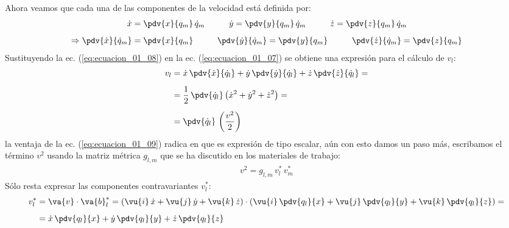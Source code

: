 Ahora veamos que cada una de las componentes de la velocidad está definida por:
\begin{align}
\begin{aligned}[b]
\dot{x} &= \pdv{x}{q_{m}} \, \dot{q}_{m} \hspace{1cm} \dot{y} = \pdv{y}{q_{m}} \, \dot{q}_{m} \hspace{1cm} \dot{z} = \pdv{z}{q_{m}} \, \dot{q}_{m} \\[0.5em]
\Rightarrow \pdv{\dot{x}}{\dot{q}_{m}} &= \pdv{x}{q_{m}}  \hspace{1cm} \pdv{\dot{y}}{\dot{q}_{m}} = \pdv{y}{q_{m}}  \hspace{1cm} \pdv{\dot{z}}{\dot{q}_{m}} = \pdv{z}{q_{m}} 
\end{aligned}
\label{eq:ecuacion_01_08}
\end{align}
Sustituyendo la ec. (\ref{eq:ecuacion_01_08}) en la ec. (\ref{eq:ecuacion_01_07}) se obtiene una expresión para el cálculo de $v_{l}$:
\begin{align}
\begin{aligned}[b]
v_{l} &= \dot{x} \, \pdv{\dot{x}}{\dot{q}_{l}} + \dot{y} \, \pdv{\dot{y}}{\dot{q}_{l}} + \dot{z} \, \pdv{\dot{z}}{\dot{q}_{l}} = \\[0.5em]
&= \dfrac{1}{2} \, \pdv{\dot{q}_{l}} \left( \dot{x}^{2} + \dot{y}^{2} + \dot{z}^{2} \right) = \\[0.5em]
&= \pdv{\dot{q}_{l}} \, \left( \dfrac{v^{2}}{2} \right)
\end{aligned}
\label{eq:ecuacion_01_09}
\end{align}
la ventaja de la ec. (\ref{eq:ecuacion_01_09}) radica en que es expresión de tipo escalar, aún con esto damos un paso más, escribamos el término $v^{2}$ usando la matriz métrica $g_{l,m}$ que se ha discutido en los materiales de trabajo:
\begin{align}
v^{2} = g_{l,m} \, v_{l}^{*} \, v_{m}^{*}
\label{eq:ecuacion_01_10}
\end{align}
Sólo resta expresar las componentes contravariantes $v_{l}^{*}$:
\begin{align}
\begin{aligned}[b]
v_{l}^{*} &= \va{v} \cdot \va{b}_{l}^{*} = (\vu{i} \, \dot{x} + \vu{j} \, \dot{y} + \vu{k} \, \dot{z}) \cdot \left( \vu{i} \, \pdv{q_{l}}{x} + \vu{j} \, \pdv{q_{l}}{y} + \vu{k} \, \pdv{q_{l}}{z} \right) = \\[0.5em]
&= \dot{x} \, \pdv{q_{l}}{x} + \dot{y} \, \pdv{q_{l}}{y} + \dot{z} \, \pdv{q_{l}}{z}
\end{aligned}
\label{eq:ecuacion_01_11}
\end{align}
